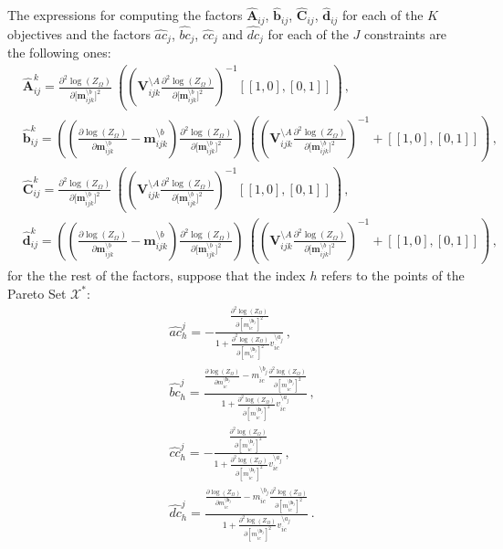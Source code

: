 \documentclass[review,preprint,12pt]{elsarticle}
\begin{document}
The expressions for computing the factors $\hat{\boldsymbol{A}}_{ij}$, $\hat{\boldsymbol{b}}_{ij}$, $\hat{\boldsymbol{C}}_{ij}$, $\hat{\boldsymbol{d}}_{ij}$ for each of the $K$ objectives and the factors $\hat{ac}_j$, $\hat{bc}_j$, $\hat{cc}_j$ and $\hat{dc}_j$ for each of the $J$ constraints are the following ones:
\begin{align}
    & \hat{\boldsymbol{A}}_{ij}^{k} = \frac{\partial^2 \log(Z_\Omega)}{\partial\big[\boldsymbol{m}_{ijk}^{\setminus b}\big]^2}\ ((\boldsymbol{V}_{ijk}^{\setminus A}\frac{\partial^2 \log(Z_\Omega)}{\partial\big[\boldsymbol{m}_{ijk}^{\setminus b}\big]^2})^{-1}[[1, 0],[0, 1]])\,,\\
    & \hat{\boldsymbol{b}}_{ij}^{k} = ((\frac{\partial \log(Z_\Omega)}{\partial\boldsymbol{m}_{ijk}^{\setminus b}} - \boldsymbol{m}_{ijk}^{\setminus b})\frac{\partial^2 \log(Z_\Omega)}{\partial\big[\boldsymbol{m}_{ijk}^{\setminus b}\big]^2})\ ((\boldsymbol{V}_{ijk}^{\setminus A}\frac{\partial^2 \log(Z_\Omega)}{\partial\big[\boldsymbol{m}_{ijk}^{\setminus b}\big]^2})^{-1}+[[1, 0],[0, 1]])\,,\\
    & \hat{\boldsymbol{C}}_{ij}^{k} = \frac{\partial^2 \log(Z_\Omega)}{\partial\big[\boldsymbol{m}_{ijk}^{\setminus b}\big]^2}\ ((\boldsymbol{V}_{ijk}^{\setminus A}\frac{\partial^2 \log(Z_\Omega)}{\partial\big[\boldsymbol{m}_{ijk}^{\setminus b}\big]^2})^{-1}[[1, 0],[0, 1]])\,,\\
    & \hat{\boldsymbol{d}}_{ij}^{k} = ((\frac{\partial \log(Z_\Omega)}{\partial\boldsymbol{m}_{ijk}^{\setminus b}} - \boldsymbol{m}_{ijk}^{\setminus b})\frac{\partial^2 \log(Z_\Omega)}{\partial\big[\boldsymbol{m}_{ijk}^{\setminus b}\big]^2})\ ((\boldsymbol{V}_{ijk}^{\setminus A}\frac{\partial^2 \log(Z_\Omega)}{\partial\big[\boldsymbol{m}_{ijk}^{\setminus b}\big]^2})^{-1}+[[1, 0],[0, 1]])\,,
\end{align}
for the the rest of the factors, suppose that the index $h$ refers to the points of the Pareto Set $\mathcal{X}^*$:
\begin{align}
    & \hat{ac}_{h}^{j} = - \frac{\frac{\partial^2 \log(Z_\Omega)}{\partial [m_{ic}^{\setminus \boldsymbol{b}_j}]^2}}{1+\frac{\partial^2 \log(Z_\Omega)}{\partial [m_{ic}^{\setminus \boldsymbol{b}_j}]^2}v_{ic}^{\setminus a_j}}\,, \\
    & \hat{bc}_{h}^{j} = \frac{\frac{\partial \log(Z_\Omega)}{\partial m_{ic}^{\setminus \boldsymbol{b}_j}}-m_{ic}^{\setminus b_j}\frac{\partial^2 \log(Z_\Omega)}{\partial [m_{ic}^{\setminus \boldsymbol{b}_j}]^2}}{1+\frac{\partial^2 \log(Z_\Omega)}{\partial [m_{ic}^{\setminus \boldsymbol{b}_j}]^2}v_{ic}^{\setminus a_j}}\,, \\
    & \hat{cc}_{h}^{j} = - \frac{\frac{\partial^2 \log(Z_\Omega)}{\partial [m_{ic}^{\setminus \boldsymbol{b}_j}]^2}}{1+\frac{\partial^2 \log(Z_\Omega)}{\partial [m_{ic}^{\setminus \boldsymbol{b}_j}]^2}v_{ic}^{\setminus a_j}}\,, \\
    & \hat{dc}_{h}^{j} = \frac{\frac{\partial \log(Z_\Omega)}{\partial m_{ic}^{\setminus \boldsymbol{b}_j}}-m_{ic}^{\setminus b_j}\frac{\partial^2 \log(Z_\Omega)}{\partial [m_{ic}^{\setminus \boldsymbol{b}_j}]^2}}{1+\frac{\partial^2 \log(Z_\Omega)}{\partial [m_{ic}^{\setminus \boldsymbol{b}_j}]^2}v_{ic}^{\setminus a_j}}\,. 
\end{align}
\end{document}
